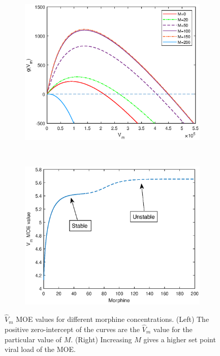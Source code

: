 \documentclass[11pt, oneside]{article}    %
\begin{document}
\begin{figure}[h]
    \centering
    \begin{subfigure}[b]{0.5\textwidth}
        \centering
        \includegraphics[scale=0.55]{some_vm_moes.eps}
    \end{subfigure}%
    ~ 
    \begin{subfigure}[b]{0.5\textwidth}
        \centering
        \includegraphics[scale=0.55]{vm_moe_sim.eps}
    \end{subfigure}
    \caption{$\hat{V}_m$ MOE values for different morphine concentrations. (Left) The positive zero-intercept of the curves are the $\hat{V}_m$ value for the particular value of $M$. (Right) Increasing $M$ gives a higher set point viral load of the MOE.}
\label{fig:moe_vm}
\end{figure}
\end{document}
